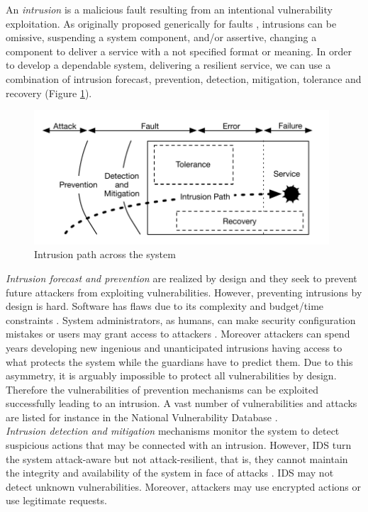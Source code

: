 An \emph{intrusion} is a malicious fault resulting from an intentional vulnerability exploitation. As originally proposed generically for faults \cite{Aviz,Powell1992}, intrusions can be omissive, suspending a system component, and/or assertive, changing a component to deliver a service with a not specified format or meaning. In order to develop a dependable system, delivering a resilient service, we can use a combination of intrusion forecast, prevention, detection, mitigation, tolerance and recovery (Figure \ref{fig:intrusion_path}). \\

\begin{figure}
\centering
\includegraphics[width=110mm]{images/intrusion}
\caption{Intrusion path across the system}
\label{fig:intrusion_path}
\end{figure}

\emph{Intrusion forecast and prevention} are realized by design and they seek to prevent future attackers from exploiting vulnerabilities. However, preventing intrusions by design is hard. Software has flaws due to its complexity and budget/time constraints \cite{Charette2005,Landwehr1992}. System administrators, as humans, can make security configuration mistakes or users may grant access to attackers \cite{Brown2001}. Moreover attackers can spend years developing new ingenious and unanticipated intrusions having access to what protects the system while the guardians have to predict them. Due to this asymmetry, it is arguably impossible to protect all vulnerabilities by design. Therefore the vulnerabilities of prevention mechanisms can be exploited successfully leading to an intrusion. A vast number of vulnerabilities and attacks are listed for instance in the National Vulnerability Database \cite{nistNVD}.\\

\emph{Intrusion detection and mitigation} mechanisms monitor the system to detect suspicious actions that may be connected with an intrusion. However, \ac{IDS} turn the system attack-aware but not attack-resilient, that is, they cannot maintain the integrity and availability of the system in face of attacks \cite{Ammann2002}. \ac{IDS} may not detect unknown vulnerabilities. Moreover, attackers may use encrypted actions or use legitimate requests.\\

